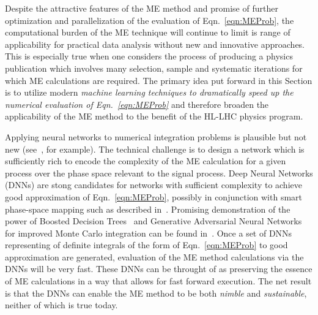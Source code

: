 Despite the attractive features of the ME method and promise of
further optimization and parallelization of the evaluation of
Eqn.~\ref{eqn:MEProb}, the computational burden of the ME technique
will continue to limit is range of applicability for practical data
analysis without new and innovative approaches. This is especially
true when one considers the process of producing a physics publication
which involves many selection, sample and systematic iterations for
which ME calculations are required. The primary idea put forward in
this Section is to utilize modern \emph{machine learning techniques to
dramatically speed up the numerical evaluation of
Eqn.~\ref{eqn:MEProb}} and therefore broaden the applicability of the
ME method to the benefit of the HL-LHC physics program.

Applying neural networks to numerical integration problems is
plausible but not new
(see~\cite{CSEarticle2006,TICNC4344207,IJMC2013}, for example). The
technical challenge is to design a network which is sufficiently rich
to encode the complexity of the ME calculation for a given process
over the phase space relevant to the signal process. Deep Neural
Networks (DNNs) are stong candidates for networks with sufficient
complexity to achieve good approximation of Eqn.~\ref{eqn:MEProb},
possibly in conjunction with smart phase-space mapping such as
described in~\cite{Artoisenet:2010cn}. Promising demonstration of the
power of Boosted Decision Trees~\cite{friedman2000,friedman2001} and
Generative Adversarial Neural Networks~\cite{GAN2014arXiv1406.2661G}
for improved Monte Carlo integration can be found
in~\cite{Bendavid:2017zhk}. Once a set of DNNs representing of
definite integrals of the form of Eqn.~\ref{eqn:MEProb} to good
approximation are generated, evaluation of the ME method calculations
via the DNNs will be very fast. These DNNs can be throught of as
preserving the essence of ME calculations in a way that allows for
fast forward execution. The net result is that the DNNs can enable the
ME method to be both \emph{nimble} and \emph{sustainable}, neither of
which is true today.
